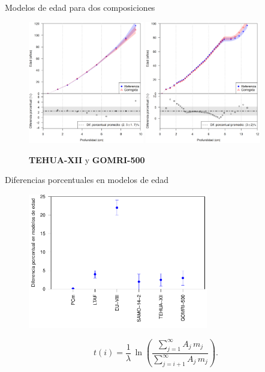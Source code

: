 \documentclass[9pt]{beamer}
\begin{document}
\begin{frame}{Modelos de edad para dos composiciones}
	\begin{figure}
		\centering
		\includegraphics[width=0.45\textwidth]{Imagenes/TEHUA_1.png}
		\includegraphics[width=0.45\textwidth]{Imagenes/GOMRI500_1.png}
		\caption{ \textbf{TEHUA-XII} y \textbf{GOMRI-500}}
	\end{figure}
\end{frame}

\begin{frame}{Diferencias porcentuales en modelos de edad}
\begin{figure}
\includegraphics[width=0.7\textwidth]{Imagenes/Resultados_Fechado.pdf}
\end{figure}
			\begin{equation}
t(i) = \dfrac{1}{\lambda}\,\ln\left(\dfrac{\sum_{j=1}^\infty A_j\, m_j}{ \sum_{j=i+1}^\infty A_j\, m_j}\right). 
			\end{equation}	
\end{frame}
\end{document}
